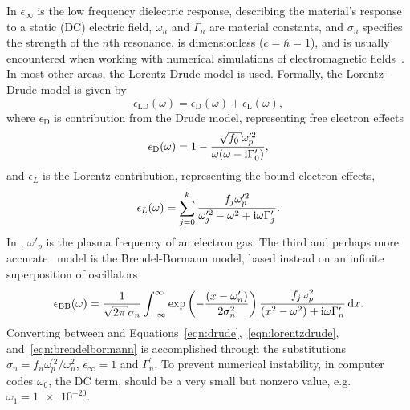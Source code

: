 In  $\epsilon_\infty$ is the low frequency
dielectric response, describing the material's response to a static (DC)
electric field, $\omega_n$ and $\Gamma_n$ are material constants, and
$\sigma_n$ specifies the strength of the $n$th resonance.
 is dimensionless ($c=\hbar=1$), and is usually
encountered when working with numerical simulations of electromagnetic
fields~\cite{oskooi2010meep}.  In most other areas, the Lorentz-Drude model is
used.  Formally, the Lorentz-Drude model is given by
\begin{equation}
  \epsilon_\mathrm{LD}(\omega)=\epsilon_\mathrm{D}(\omega)+\epsilon_\mathrm{L}(\omega),
\end{equation}
where $\epsilon_\mathrm{D}$ is contribution from the Drude model, representing
free electron effects
\begin{align}
  \epsilon_\mathrm{D}(\omega)=1-\frac{\sqrt{f_0} \omega_p^{\prime 2}}{\omega(\omega -
    \mi\Gamma_0^\prime)},
  \label{eqn:drude}
\end{align}
and $\epsilon_L$ is the Lorentz contribution, representing the bound
electron effects,
\begin{align}
  \epsilon_L(\omega) =\sum_{j=0}^{k}\frac{f_j\omega_p^{\prime 2}}{\omega_j^{\prime
      2}-\omega^2+{\mathrm{i}}\omega\Gamma_j^\prime}.
  \label{eqn:lorentzdrude}
\end{align}
In , $\omega'_p$ is the plasma frequency of an
electron gas.  The third and perhaps more
accurate~\cite{jahanshahi2014study} model is the
Brendel-Bormann model, based instead on an infinite superposition
of oscillators
\begin{align}
  \epsilon_\text{BB}(\omega) = \frac{1}{\sqrt{2 \pi} \sigma_n} \intinfty
  \exp\left(-\frac{(x-\omega'_n)}{2 \sigma_n^2}\right)
  \frac{f_j \omega_p^2}{(x^2-\omega^2)+\mi \omega \Gamma'_n} \md x.
  \label{eqn:brendelbormann}
\end{align}
Converting between  and
Equations~\ref{eqn:drude},~\ref{eqn:lorentzdrude},
and~\ref{eqn:brendelbormann} is accomplished through the substitutions
$\sigma_n = {f_n \omega_p^{\prime 2}}/{\omega_n^2}$, $\epsilon_\infty=1$ and
$\Gamma_n^\prime$.  To prevent numerical instability, in computer codes
$\omega_0$, the DC term, should be a very small but nonzero value, e.g.
$\omega_1 = \num{1e-20}$.


